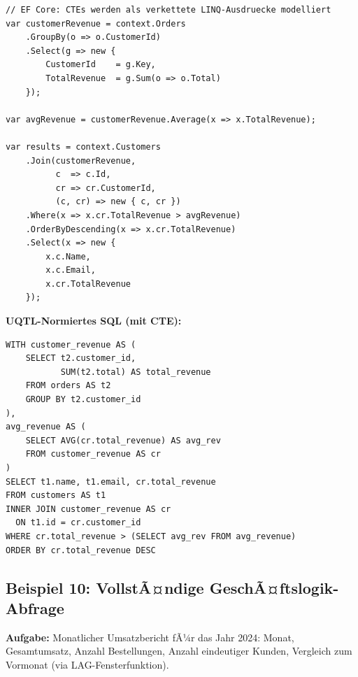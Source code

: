 \begin{lstlisting}[style=csharpstyle, caption={Beispiel 9 -- C\# (CTE-Aequivalent)},
  label=lst:bsp9_cs]
// EF Core: CTEs werden als verkettete LINQ-Ausdruecke modelliert
var customerRevenue = context.Orders
    .GroupBy(o => o.CustomerId)
    .Select(g => new {
        CustomerId    = g.Key,
        TotalRevenue  = g.Sum(o => o.Total)
    });

var avgRevenue = customerRevenue.Average(x => x.TotalRevenue);

var results = context.Customers
    .Join(customerRevenue,
          c  => c.Id,
          cr => cr.CustomerId,
          (c, cr) => new { c, cr })
    .Where(x => x.cr.TotalRevenue > avgRevenue)
    .OrderByDescending(x => x.cr.TotalRevenue)
    .Select(x => new {
        x.c.Name,
        x.c.Email,
        x.cr.TotalRevenue
    });
\end{lstlisting}

\begin{successbox}
\textbf{UQTL-Normiertes SQL (mit CTE):}
\begin{lstlisting}[style=sqlstyle, numbers=none]
WITH customer_revenue AS (
    SELECT t2.customer_id,
           SUM(t2.total) AS total_revenue
    FROM orders AS t2
    GROUP BY t2.customer_id
),
avg_revenue AS (
    SELECT AVG(cr.total_revenue) AS avg_rev
    FROM customer_revenue AS cr
)
SELECT t1.name, t1.email, cr.total_revenue
FROM customers AS t1
INNER JOIN customer_revenue AS cr
  ON t1.id = cr.customer_id
WHERE cr.total_revenue > (SELECT avg_rev FROM avg_revenue)
ORDER BY cr.total_revenue DESC
\end{lstlisting}
\end{successbox}

\subsection{Beispiel 10: VollstÃ¤ndige GeschÃ¤ftslogik-Abfrage}
\label{subsec:bsp10}

\textbf{Aufgabe:} Monatlicher Umsatzbericht fÃ¼r das Jahr 2024: Monat, Gesamtumsatz,
Anzahl Bestellungen, Anzahl eindeutiger Kunden, Vergleich zum Vormonat
(via LAG-Fensterfunktion).


